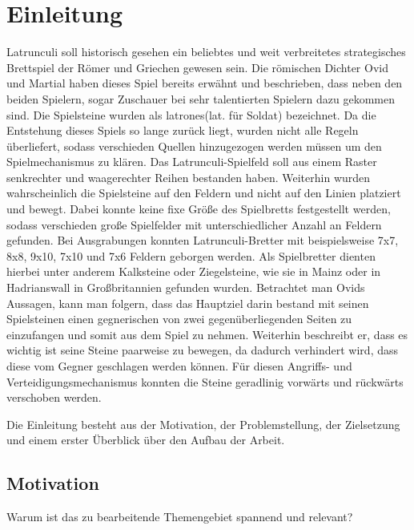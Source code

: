 
\chapter{Einleitung}
\label{ch:Einleitung}
Latrunculi soll historisch gesehen ein beliebtes und weit verbreitetes strategisches Brettspiel der Römer und Griechen gewesen sein. Die römischen Dichter Ovid und Martial haben dieses Spiel bereits erwähnt und beschrieben, dass neben den beiden Spielern, sogar Zuschauer bei sehr talentierten Spielern dazu gekommen sind. Die Spielsteine wurden als latrones(lat. für Soldat) bezeichnet. Da die Entstehung dieses Spiels so lange zurück liegt, wurden nicht alle Regeln überliefert, sodass verschieden Quellen hinzugezogen werden müssen um den Spielmechanismus zu klären. Das Latrunculi-Spielfeld soll aus einem Raster senkrechter und waagerechter Reihen bestanden haben. Weiterhin wurden wahrscheinlich die Spielsteine auf den Feldern und nicht auf den Linien platziert und bewegt. Dabei konnte keine fixe Größe des Spielbretts festgestellt werden, sodass verschieden große Spielfelder mit unterschiedlicher Anzahl an Feldern gefunden. Bei Ausgrabungen konnten Latrunculi-Bretter mit beispielsweise 7x7, 8x8, 9x10, 7x10 und 7x6 Feldern geborgen werden. Als Spielbretter dienten hierbei unter anderem Kalksteine oder Ziegelsteine, wie sie in Mainz oder in Hadrianswall in Großbritannien gefunden wurden. Betrachtet man Ovids Aussagen, kann man folgern, dass das Hauptziel darin bestand mit seinen Spielsteinen einen gegnerischen von zwei gegenüberliegenden Seiten zu einzufangen und somit aus dem Spiel zu nehmen. Weiterhin beschreibt er, dass es wichtig ist seine Steine paarweise zu bewegen, da dadurch verhindert wird, dass diese vom Gegner geschlagen werden können. Für diesen Angriffs- und Verteidigungsmechanismus konnten die Steine geradlinig vorwärts und rückwärts verschoben werden.

Die Einleitung besteht aus der Motivation, der Problemstellung, der Zielsetzung und einem erster Überblick über den Aufbau der Arbeit.

\section{Motivation}
\label{ch:Einleitung:sec:Motivation}

Warum ist das zu bearbeitende Themengebiet spannend und relevant?

